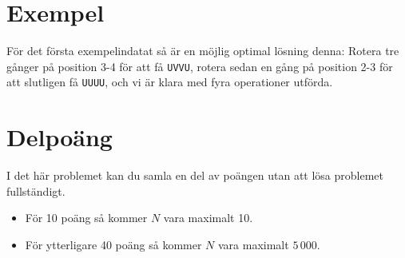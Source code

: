 \section*{Exempel}
För det första exempelindatat så är en möjlig optimal lösning denna: Rotera
tre gånger på position 3-4 för att få \texttt{UVVU}, rotera sedan en gång på
position 2-3 för att slutligen få \texttt{UUUU}, och vi är klara med fyra
operationer utförda.

\section*{Delpoäng} I det här problemet kan du samla en del av poängen utan att
lösa problemet fullständigt.

\begin{itemize}
    \item För 10 poäng så kommer $N$ vara maximalt 10.
    \item För ytterligare 40 poäng så kommer $N$ vara maximalt $5\,000$.
\end{itemize}

